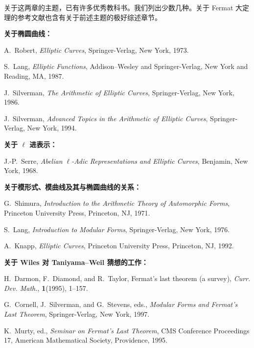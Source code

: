 关于这两章的主题，已有许多优秀教科书。我们列出少数几种。关于 Fermat 大定理的参考文献也含有关于前述主题的极好综述章节。

\par\medskip\noindent\textbf{关于椭圆曲线：}
\begin{enumerate}[label={[\arabic*]},leftmargin=2.2em,itemsep=0.15em]
\item A.~Robert, \emph{Elliptic Curves}, Springer-Verlag, New York, 1973.
\item S.~Lang, \emph{Elliptic Functions}, Addison--Wesley and Springer-Verlag, New York and Reading, MA, 1987.
\item J.~Silverman, \emph{The Arithmetic of Elliptic Curves}, Springer-Verlag, New York, 1986.
\item J.~Silverman, \emph{Advanced Topics in the Arithmetic of Elliptic Curves}, Springer-Verlag, New York, 1994.
\end{enumerate}

\par\medskip\noindent\textbf{关于 $\ell$ 进表示：}
\begin{enumerate}[label={[\arabic*]},leftmargin=2.2em,itemsep=0.15em,start=5]
\item J.-P.~Serre, \emph{Abelian $\ell$-Adic Representations and Elliptic Curves}, Benjamin, New York, 1968.
\end{enumerate}

\par\medskip\noindent\textbf{关于模形式、模曲线及其与椭圆曲线的关系：}
\begin{enumerate}[label={[\arabic*]},leftmargin=2.2em,itemsep=0.15em,start=6]
\item G.~Shimura, \emph{Introduction to the Arithmetic Theory of Automorphic Forms}, Princeton University Press, Princeton, NJ, 1971.
\item S.~Lang, \emph{Introduction to Modular Forms}, Springer-Verlag, New York, 1976.
\item A.~Knapp, \emph{Elliptic Curves}, Princeton University Press, Princeton, NJ, 1992.
\end{enumerate}

\par\medskip\noindent\textbf{关于 Wiles 对 Taniyama--Weil 猜想的工作：}
\begin{enumerate}[label={[\arabic*]},leftmargin=2.2em,itemsep=0.15em,start=9]
\item H.~Darmon, F.~Diamond, and R.~Taylor, Fermat's last theorem (a survey), \emph{Curr. Dev. Math.}, \textbf{1}(1995), 1--157.
\item G.~Cornell, J.~Silverman, and G.~Stevens, eds., \emph{Modular Forms and Fermat's Last Theorem}, Springer-Verlag, New York, 1997.
\item K.~Murty, ed., \emph{Seminar on Fermat's Last Theorem}, CMS Conference Proceedings 17, American Mathematical Society, Providence, 1995.
\end{enumerate}

